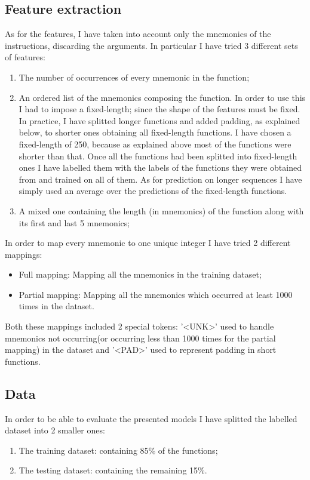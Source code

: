\documentclass[a4paper]{article}
\begin{document}
\subsection{Feature extraction}
As for the features, I have taken into account only the mnemonics of the instructions, discarding the arguments.
In particular I have tried 3 different sets of features:
\begin{enumerate}
\item The number of occurrences of every mnemonic in the function;
\item An ordered list of the mnemonics composing the function. In order to use this I had to impose a fixed-length; since the shape of the features must be fixed. In practice, I have splitted longer functions and added padding, as explained below, to shorter ones obtaining all fixed-length functions. I have chosen a fixed-length of 250, because as explained above most of the functions were shorter than that. Once all the functions had been splitted into fixed-length ones I have labelled them with the labels of the functions they were obtained from and trained on all of them. As for prediction on longer sequences I have simply used an average over the predictions of the fixed-length functions.
\item A mixed one containing the length (in mnemonics) of the function along with its first and last 5 mnemonics;
\end{enumerate}
In order to map every mnemonic to one unique integer I have tried 2 different mappings:

\begin{itemize}
\item Full mapping: Mapping all the mnemonics in the training dataset;
\item Partial mapping: Mapping all the mnemonics which occurred at least 1000 times in the dataset.
\end{itemize}
Both these mappings included 2 special tokens: '\textless UNK\textgreater ' used to handle mnemonics not occurring(or occurring less than 1000 times for the partial mapping) in the dataset and '\textless PAD\textgreater ' used to represent padding in short functions.  
\subsection{Data}
In order to be able to evaluate the presented models I have splitted the labelled dataset into 2 smaller ones:
\begin{enumerate}
\item The training dataset: containing 85\% of the functions;
\item The testing dataset: containing the remaining 15\%.
\end{enumerate}
\newpage
\end{document}
